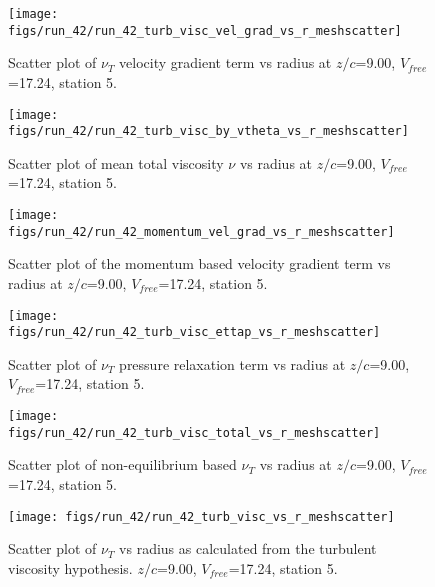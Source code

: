 \begin{figure}[H]
\centering
\texttt{[image: figs/run\_42/run\_42\_turb\_visc\_vel\_grad\_vs\_r\_meshscatter]}
\caption{Scatter plot of $\nu_T$ velocity gradient term vs radius at $z/c$=9.00, $V_{free}$=17.24, station 5.}
\end{figure}


\begin{figure}[H]
\centering
\texttt{[image: figs/run\_42/run\_42\_turb\_visc\_by\_vtheta\_vs\_r\_meshscatter]}
\caption{Scatter plot of mean total viscosity $\nu$ vs radius at $z/c$=9.00, $V_{free}$=17.24, station 5.}
\end{figure}


\begin{figure}[H]
\centering
\texttt{[image: figs/run\_42/run\_42\_momentum\_vel\_grad\_vs\_r\_meshscatter]}
\caption{Scatter plot of the momentum based velocity gradient term vs radius at $z/c$=9.00, $V_{free}$=17.24, station 5.}
\end{figure}


\begin{figure}[H]
\centering
\texttt{[image: figs/run\_42/run\_42\_turb\_visc\_ettap\_vs\_r\_meshscatter]}
\caption{Scatter plot of $\nu_T$ pressure relaxation term vs radius at $z/c$=9.00, $V_{free}$=17.24, station 5.}
\end{figure}


\begin{figure}[H]
\centering
\texttt{[image: figs/run\_42/run\_42\_turb\_visc\_total\_vs\_r\_meshscatter]}
\caption{Scatter plot of non-equilibrium based $\nu_T$ vs radius at $z/c$=9.00, $V_{free}$=17.24, station 5.}
\end{figure}


\begin{figure}[H]
\centering
\texttt{[image: figs/run\_42/run\_42\_turb\_visc\_vs\_r\_meshscatter]}
\caption{Scatter plot of $\nu_T$ vs radius as calculated from the turbulent viscosity hypothesis. $z/c$=9.00, $V_{free}$=17.24, station 5.}
\end{figure}


